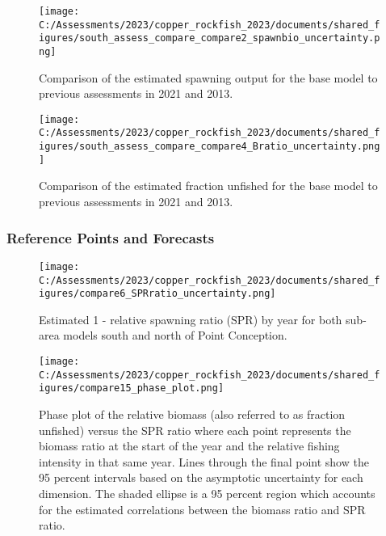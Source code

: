 \documentclass[11pt,
  english,
  letterpaper,
]{article}
\begin{document}
\begin{figure}
\centering
\texttt{[image: C:/Assessments/2023/copper\_rockfish\_2023/documents/shared\_figures/south\_assess\_compare\_compare2\_spawnbio\_uncertainty.png]}
\caption{Comparison of the estimated spawning output for the base model to previous assessments in 2021 and 2013.\label{fig:comp-assess-sb}}
\end{figure}

\newpage

\begin{figure}
\centering
\texttt{[image: C:/Assessments/2023/copper\_rockfish\_2023/documents/shared\_figures/south\_assess\_compare\_compare4\_Bratio\_uncertainty.png]}
\caption{Comparison of the estimated fraction unfished for the base model to previous assessments in 2021 and 2013.\label{fig:comp-assess-depl}}
\end{figure}

\newpage

\hypertarget{reference-points-and-forecasts}{%
\subsubsection{Reference Points and Forecasts}\label{reference-points-and-forecasts}}

\begin{figure}
\centering
\texttt{[image: C:/Assessments/2023/copper\_rockfish\_2023/documents/shared\_figures/compare6\_SPRratio\_uncertainty.png]}
\caption{Estimated 1 - relative spawning ratio (SPR) by year for both sub-area models south and north of Point Conception.\label{fig:1-spr}}
\end{figure}

\clearpage

\begin{figure}
\centering
\texttt{[image: C:/Assessments/2023/copper\_rockfish\_2023/documents/shared\_figures/compare15\_phase\_plot.png]}
\caption{Phase plot of the relative biomass (also referred to as fraction unfished) versus the SPR ratio where each point represents the biomass ratio at the start of the year and the relative fishing intensity in that same year. Lines through the final point show the 95 percent intervals based on the asymptotic uncertainty for each dimension. The shaded ellipse is a 95 percent region which accounts for the estimated correlations between the biomass ratio and SPR ratio.\label{fig:phase}}
\end{figure}
\end{document}
